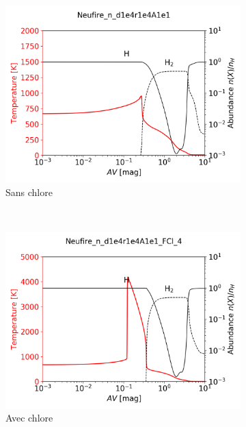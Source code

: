\begin{figure}[htbp]
    \centering
    \begin{subfigure}[t]{0.49\textwidth} 
        \centering \includegraphics[trim = {0 0 0 1cm},clip,width=1\textwidth]{figure/Cl/neufire/profil_H_noCl.png}
        \caption{Sans chlore}
    \end{subfigure}
    ~ 
    \begin{subfigure}[t]{0.49\textwidth}
        \centering \includegraphics[trim = {0 0cm 0 1cm},clip,width=1\textwidth]{figure/Cl/neufire/profil_H.png}
        \caption{Avec chlore}
    \end{subfigure}
    \caption{}
    \label{fig:Cl:firstprofil}
\end{figure}


